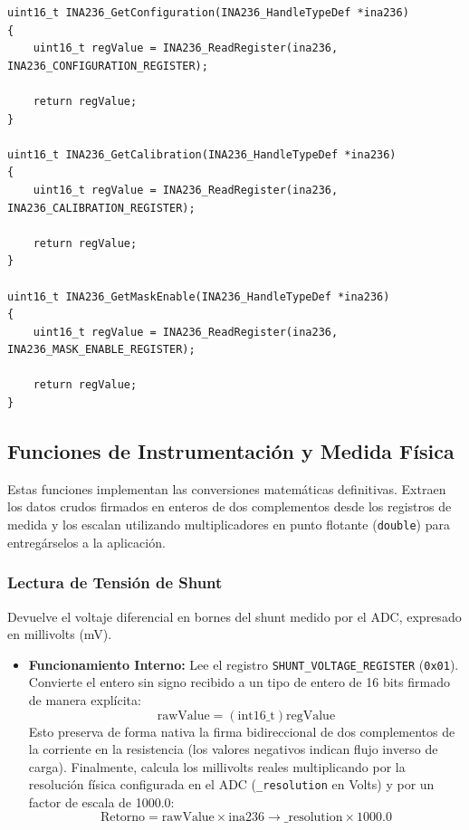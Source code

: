 \documentclass[
10pt, %
a4paper, %
oneside, %
headinclude,footinclude, %
BCOR5mm, %
]{scrartcl}
\begin{document}
\begin{lstlisting}[style=CMakeStyle]
uint16_t INA236_GetConfiguration(INA236_HandleTypeDef *ina236)
{
    uint16_t regValue = INA236_ReadRegister(ina236, INA236_CONFIGURATION_REGISTER);

    return regValue;
}

uint16_t INA236_GetCalibration(INA236_HandleTypeDef *ina236)
{
    uint16_t regValue = INA236_ReadRegister(ina236, INA236_CALIBRATION_REGISTER);

    return regValue;
}

uint16_t INA236_GetMaskEnable(INA236_HandleTypeDef *ina236)
{
    uint16_t regValue = INA236_ReadRegister(ina236, INA236_MASK_ENABLE_REGISTER);

    return regValue;
}
\end{lstlisting}

\subsection{Funciones de Instrumentación y Medida Física}
Estas funciones implementan las conversiones matemáticas definitivas. Extraen los datos crudos firmados en enteros de dos complementos desde los registros de medida y los escalan utilizando multiplicadores en punto flotante (\texttt{double}) para entregárselos a la aplicación.

\subsubsection{Lectura de Tensión de Shunt}
Devuelve el voltaje diferencial en bornes del shunt medido por el ADC, expresado en millivolts (mV).

\begin{itemize}
	\item \textbf{Funcionamiento Interno:}
		Lee el registro \texttt{SHUNT\_VOLTAGE\_REGISTER} (\texttt{0x01}). Convierte el entero sin signo recibido a un tipo de entero de 16 bits firmado de manera explícita:
		\begin{equation}
			\text{rawValue} = (\text{int16\_t})\text{regValue}
		\end{equation}
		Esto preserva de forma nativa la firma bidireccional de dos complementos de la corriente en la resistencia (los valores negativos indican flujo inverso de carga). Finalmente, calcula los millivolts reales multiplicando por la resolución física configurada en el ADC (\texttt{\_resolution} en Volts) y por un factor de escala de 1000.0:
		\begin{equation}
			\text{Retorno} = \text{rawValue} \times \text{ina236}\rightarrow\text{\_resolution} \times 1000.0
		\end{equation}
\end{itemize}
\end{document}
